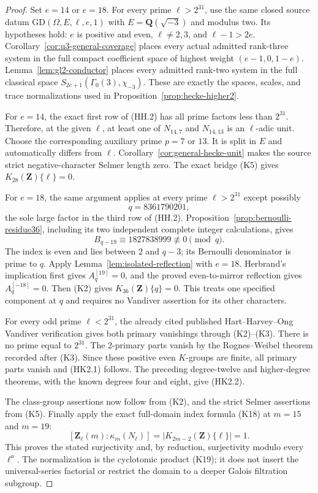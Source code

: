 \documentclass[11pt,a4paper]{article}
\theoremstyle{definition}
\begin{document}
\begin{proof}
Set $e=14$ or $e=18$.
For every prime $\ell>2^{31}$, use the same closed source datum
$\mathrm{GD}(\Omega,E,\ell,e,1)$ with
$E=\mathbf Q(\sqrt{-3})$ and modulus two.
Its hypotheses hold: $e$ is positive and even, $\ell\ne2,3$,
and $\ell-1>2e$.
Corollary~\ref{cor:u3-general-coverage} places every actual admitted
rank-three system in the full compact coefficient space of highest
weight $(e-1,0,1-e)$.
Lemma~\ref{lem:gl2-conductor} places every admitted rank-two system
in the full classical space $S_{2e+1}(\Gamma_0(3),\chi_{-3})$.
These are exactly the spaces, scales, and trace normalizations used in
Proposition~\ref{prop:hecke-higher2}.

For $e=14$, the exact first row of (HH.2) has all prime factors
less than $2^{31}$.
Therefore, at the given $\ell$, at least one of $N_{14,7}$ and
$N_{14,13}$ is an $\ell$-adic unit.
Choose the corresponding auxiliary prime $p=7$ or $13$.
It is split in $E$ and automatically differs from $\ell$.
Corollary~\ref{cor:general-hecke-unit} makes the source strict
negative-character Selmer length zero.
The exact bridge (K5) gives
$K_{28}(\mathbf Z)\{\ell\}=0$.

For $e=18$, the same argument applies at every prime
$\ell>2^{31}$ except possibly
\[
                              q=8361790201,
\]
the sole large factor in the third row of (HH.2).
Proposition~\ref{prop:bernoulli-residue36}, including its two independent
complete integer calculations, gives
\[
                B_{q-19}\equiv1827838999\not\equiv0\pmod q.
\]
The index is even and lies between $2$ and $q-3$;
its Bernoulli denominator is prime to $q$.
Apply Lemma~\ref{lem:isolated-reflection} with $e=18$.
Herbrand's implication first gives $A_q^{[19]}=0$,
and the proved even-to-mirror reflection gives $A_q^{[-18]}=0$.
Then (K2) gives $K_{36}(\mathbf Z)\{q\}=0$.
This treats one specified component at $q$ and requires no
Vandiver assertion for its other characters.

For every odd prime $\ell<2^{31}$, the already cited published
Hart--Harvey--Ong Vandiver verification gives both primary vanishings
through (K2)--(K3). There is no prime equal to $2^{31}$.
The 2-primary parts vanish by the Rognes--Weibel theorem recorded
after (K3). Since these positive even $K$-groups are finite,
all primary parts vanish and (HK2.1) follows.
The preceding degree-twelve and higher-degree theorems, with the known
degrees four and eight, give (HK2.2).

The class-group assertions now follow from (K2), and the strict Selmer
assertions from (K5).
Finally apply the exact full-domain index formula (K18) at
$m=15$ and $m=19$:
\[
 [\mathbf Z_\ell(m):\kappa_m(N_\ell)]
       =|K_{2m-2}(\mathbf Z)\{\ell\}|=1.
\]
This proves the stated surjectivity and, by reduction, surjectivity
modulo every $\ell^a$.
The normalization is the cyclotomic product (K19); it does not insert
the universal-series factorial or restrict the domain to a deeper
Galois filtration subgroup.
\end{proof}
\end{document}
